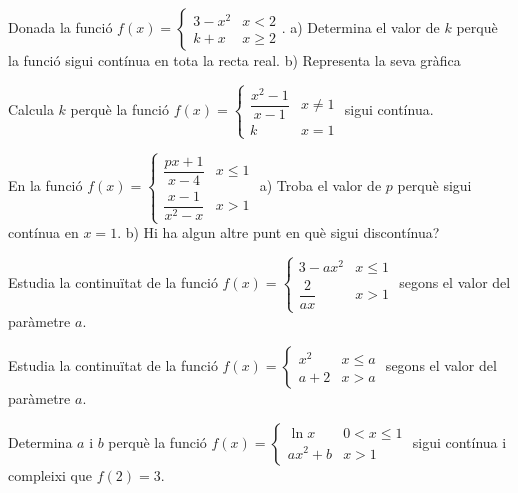 \begin{mylist}		
	\exer Donada la funció $f(x)=\left\{\begin{array}{cc} {3-x^{2} } & {x<2} \\ {k+x} & {x\ge 2} \end{array}\right. $.  a) Determina el valor de  $k$ perquè la funció sigui contínua en tota la recta real. b) Representa la seva gràfica 
	
	
	\exer Calcula $k$ perquè la funció $f(x)=\left\{ \begin{array}{ll}
	\dfrac{x^2-1}{x-1}  & x \neq 1 \\
	k & x = 1
	\end{array} \right.$ sigui contínua.
	
	 
	\exer En la funció $f(x)=\left\{ \begin{array}{ll}
	\dfrac{px+1}{x-4}  & x \leq 1 \\
	\dfrac{x-1}{x^2-x} & x > 1
	\end{array} \right.$
	a) Troba el valor de $p$ perquè sigui contínua en $x=1$. b) Hi ha algun altre punt en què sigui discontínua?
	
 	
	\exer Estudia la continuïtat de la funció $f(x)=\left\{ \begin{array}{ll}
		3-ax^2  & x \leq 1 \\
	\dfrac{2}{ax} & x > 1
	\end{array} \right.$ segons el valor del paràmetre $a$.


	\exer[-1] Estudia la continuïtat de la funció $f(x)=\left\{ \begin{array}{ll}
	x^2  & x \leq a \\
	a+2 & x > a
	\end{array} \right.$ segons el valor del paràmetre $a$.
	
 

	\exer Determina $a$ i $b$ perquè la funció $f(x)=\left\{ \begin{array}{ll}
	\ln x  & 0 < x \leq 1 \\
	a x^2 +b & x > 1
	\end{array} \right.$ sigui contínua i compleixi que $f(2)=3$.

	
\end{mylist}


